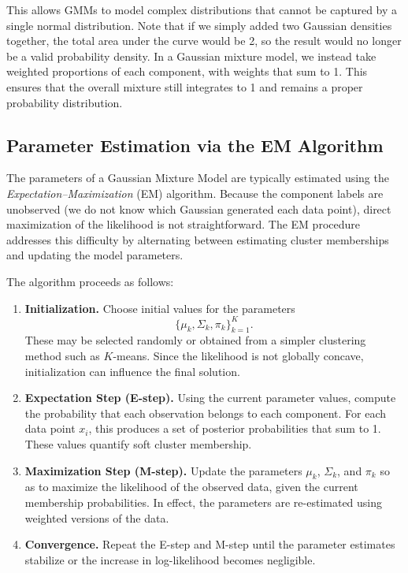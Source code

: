 This allows GMMs to model complex distributions that cannot be captured by a single normal distribution. Note that if we simply added two Gaussian densities together, the total area under the curve would be 2, so the result would no longer be a valid probability density. In a Gaussian mixture model, we instead take weighted proportions of each component, with weights that sum to 1. This ensures that the overall mixture still integrates to 1 and remains a proper probability distribution.

\bigskip

\subsection{Parameter Estimation via the EM Algorithm}

\medskip

The parameters of a Gaussian Mixture Model are typically estimated using the \emph{Expectation–Maximization} (EM) algorithm. Because the component labels are unobserved (we do not know which Gaussian generated each data point), direct maximization of the likelihood is not straightforward. The EM procedure addresses this difficulty by alternating between estimating cluster memberships and updating the model parameters.

\medskip

The algorithm proceeds as follows:

\begin{enumerate}[itemsep=0.8em]
    \item \textbf{Initialization.}
    Choose initial values for the parameters
    \[
    \{\mu_k, \Sigma_k, \pi_k\}_{k=1}^K.
    \]
    These may be selected randomly or obtained from a simpler
    clustering method such as $K$-means. Since the likelihood is not
    globally concave, initialization can influence the final solution.

    \item \textbf{Expectation Step (E-step).}
    Using the current parameter values, compute the probability that
    each observation belongs to each component. For each data point
    $x_i$, this produces a set of posterior probabilities that sum to 1.
    These values quantify soft cluster membership.

    \item \textbf{Maximization Step (M-step).}
    Update the parameters $\mu_k$, $\Sigma_k$, and $\pi_k$ so as to
    maximize the likelihood of the observed data, given the current
    membership probabilities. In effect, the parameters are re-estimated
    using weighted versions of the data.

    \item \textbf{Convergence.}
    Repeat the E-step and M-step until the parameter estimates stabilize
    or the increase in log-likelihood becomes negligible.
\end{enumerate}

